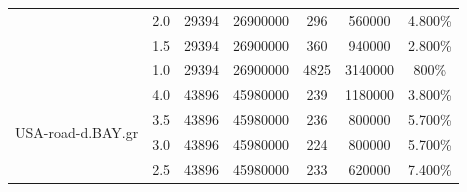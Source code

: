 \begin{table}[H]
\begin{adjustbox}{max width=\textwidth}
\begin{tabular}{|c|c|c|c|c|c|c|}
                                   & 2.0                                     & 29394                                & 26900000                                     & 296                                    & 560000                                         & 4.800\%                                                        \\ \cline{2-7} 
                                   & 1.5                                     & 29394                                & 26900000                                     & 360                                    & 940000                                         & 2.800\%                                                        \\ \cline{2-7} 
                                   & 1.0                                     & 29394                                & 26900000                                     & 4825                                   & 3140000                                        & 800\%                                                          \\ \hline
\multirow{7}{*}{USA-road-d.BAY.gr} & 4.0                                     & 43896                                & 45980000                                     & 239                                    & 1180000                                        & 3.800\%                                                        \\ \cline{2-7} 
                                   & 3.5                                     & 43896                                & 45980000                                     & 236                                    & 800000                                         & 5.700\%                                                        \\ \cline{2-7} 
                                   & 3.0                                     & 43896                                & 45980000                                     & 224                                    & 800000                                         & 5.700\%                                                        \\ \cline{2-7} 
                                   & 2.5                                     & 43896                                & 45980000                                     & 233                                    & 620000                                         & 7.400\%                                                        \\ \cline{2-7} 

\end{tabular}
\end{adjustbox}
\end{table}

